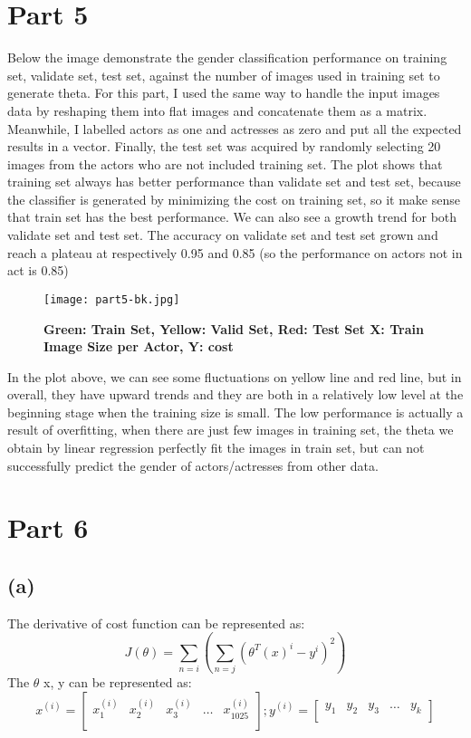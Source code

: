 \documentclass{article}
\begin{document}
\section*{Part 5}
Below the image demonstrate the gender classification performance on training set, validate set, test set, against the number of images used in training set to generate theta. For this part, I used the same way to handle the input images data by reshaping them into flat images and concatenate them as a matrix. Meanwhile, I labelled actors as one and actresses as zero and put all the expected results in a vector. Finally, the test set was acquired by randomly selecting 20 images from the actors who are not included training set.
The plot shows that training set always has better performance than validate set and test set, because the classifier is generated by minimizing the cost on training set, so it make sense that train set has the best performance. We can also see a growth trend for both validate set and test set. The accuracy on validate set and test set grown and reach a plateau at respectively 0.95 and 0.85 (so the performance on actors not in act is 0.85)

\begin{figure}[!htb]
  \texttt{[image: part5-bk.jpg]}
  \caption*{\Large \textbf{\hspace*{3cm}Green: Train Set, Yellow: Valid Set, Red: Test Set \newline \hspace*{4.5cm}X: Train Image Size per Actor, Y: cost}}\label{fig:part5}
\end{figure}


In the plot above, we can see some fluctuations on yellow line and red line, but in overall, they have upward trends and they are both in a relatively low level at the beginning stage when the training size is small. The low performance is actually a result of overfitting, when there are just few images in training set, the theta we obtain by linear regression perfectly fit the images in train set, but can not successfully predict the gender of actors/actresses from other data.


\vspace*{3cm}
\section*{Part 6}
\subsection*{(a)}The derivative of cost function can be represented as:\[ J(\theta) = \sum_{n=i}(\sum_{n=j} (\theta^T(x)^i - y^i)^2)\]
The $\theta$ x, y can be represented as: 
\[
x^{(i)}
=
\begin{bmatrix}
x_{1}^{(i)} & x_{2}^{(i)} & x_{3}^{(i)} & \dots  & x_{1025}^{(i)} \\
\end{bmatrix}; 
y^{(i)}
=\begin{bmatrix}
y_{1}& y_{2} & y_{3} & \dots  & y_{k} \\
\end{bmatrix}
\]
\end{document}
